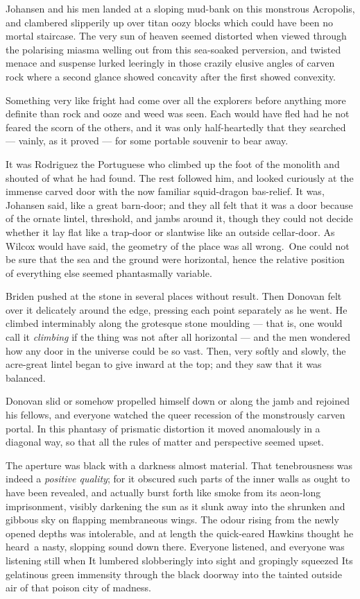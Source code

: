 Johansen and his men landed at a sloping mud-bank on this monstrous
Acropolis, and clambered slipperily up over titan oozy blocks which
could have been no mortal staircase. The very sun of heaven seemed
distorted when viewed through the polarising miasma welling out from
this sea-soaked perversion, and twisted menace and suspense lurked
leeringly in those crazily elusive angles of carven rock where a second
glance showed concavity after the first showed convexity.

Something very like fright had come over all the explorers before
anything more definite than rock and ooze and weed was seen. Each would
have fled had he not feared the scorn of the others, and it was only
half-heartedly that they searched --- vainly, as it proved --- for some
portable souvenir to bear away.

It was Rodriguez the Portuguese who climbed up the foot of the monolith
and shouted of what he had found. The rest followed him, and looked
curiously at the immense carved door with the now familiar squid-dragon
bas-relief. It was, Johansen said, like a great barn-door; and they all
felt that it was a door because of the ornate lintel, threshold, and
jambs around it, though they could not decide whether it lay flat like a
trap-door or slantwise like an outside cellar-door. As Wilcox would have
said, the geometry of the place was all wrong.\est\ One could not be sure
that the sea and the ground were horizontal, hence the relative position
of everything else seemed phantasmally variable.

Briden pushed at the stone in several places without result. Then
Donovan felt over it delicately around the edge, pressing each point
separately as he went. He climbed interminably along the grotesque stone
moulding --- that is, one would call it \emph{climbing} if the thing was not
after all horizontal --- and the men wondered how any door in the universe
could be so vast. Then, very softly and slowly, the acre-great lintel
began to give inward at the top; and they saw that it was balanced.

Donovan slid or somehow propelled himself down or along the jamb and
rejoined his fellows, and everyone watched the queer recession of the
monstrously carven portal. In this phantasy of prismatic distortion it
moved anomalously in a diagonal way, so that all the rules of matter and
perspective seemed upset.

The aperture was black with a darkness almost material. That
tenebrousness was indeed a \emph{positive quality}; for it obscured such parts
of the inner walls as ought to have been revealed, and actually burst
forth like smoke from its aeon-long imprisonment, visibly darkening the
sun as it slunk away into the shrunken and gibbous sky on flapping
membraneous wings. The odour rising from the newly opened depths was
intolerable, and at length the quick-eared Hawkins thought he heard\est\ a
nasty, slopping sound down there. Everyone listened, and everyone was
listening still when It lumbered slobberingly into sight and gropingly
squeezed Its gelatinous green immensity through the black doorway into
the tainted outside air of that poison city of madness.


